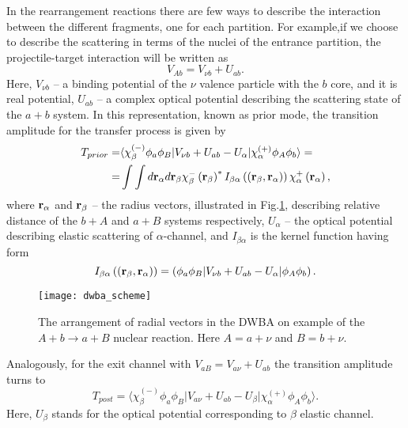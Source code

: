 \documentclass[
12pt, %
oneside, %
english, %
onehalfspacing, %
onehalfspacing, %
headsepline, %
]{MastersDoctoralThesis} %
\begin{document}
In the rearrangement reactions there are few ways to describe the interaction between the different fragments, one for each partition. 
For example,if we choose to describe the scattering in terms of the nuclei of the entrance partition, the projectile-target interaction will be written as
\begin{equation}
V_{Ab}=V_{\nu b} + U_{ab}.
\end{equation}
Here, $V_{\nu b}$ -- a binding potential of the $\nu$ valence particle with the $b$ core, and it is real potential, $U_{ab}$ -- a complex optical potential describing the scattering state of the $a+b$ system.  
In this representation, known as prior mode, the transition amplitude for the transfer process is given by
 \begin{align}
 T_{prior} =& \langle \chi_\beta^{(-)} \phi_a \phi_B  \vert
  V_{\nu b}+U_{ab}-U_{\alpha} \vert
   \chi_\alpha^{(+)} \phi_A \phi_b \rangle = 
   \nonumber \\
= & \int \int d {\bf r}_\alpha  d {\bf r}_\beta
\chi^{-}_\beta \left( {\bf r}_\beta \right)^* 
I_{\beta \alpha}  \left( \left( {\bf r}_\beta ,  {\bf r}_\alpha \right) \right)
\chi^{+}_\alpha \left( {\bf r}_\alpha \right),
\label{dwba_amplitude}
 \end{align}
where ${\bf r}_\alpha$ and ${\bf r}_\beta$ -- the radius vectors, illustrated in Fig.\ref{fig:dwba_scheme}, describing relative distance of the $b+A$ and $a+B$ systems respectively,  $U_\alpha$ -- the optical potential describing elastic scattering of $\alpha$-channel, and $I_{\beta \alpha}$ is the kernel function having form
\begin{equation}
I_{\beta \alpha}  \left( \left( {\bf r}_\beta ,  {\bf r}_\alpha \right) \right) =
\left( \phi_a \phi_B  \vert 
 V_{\nu b}+U_{ab}-U_{\alpha} \vert
 \phi_A \phi_b  \right).
\end{equation}
 
\begin{figure}[tp]
\centering
\texttt{[image: dwba\_scheme]}
\decoRule
\caption{ \footnotesize The arrangement of radial vectors in the DWBA 
on example of the $A+b \rightarrow a + B$ nuclear reaction. Here $A=a+\nu$ 
and $B=b+\nu$. }
\label{fig:dwba_scheme}
\end{figure} 
 
 Analogously, for the exit channel with $V_{aB}= V_{a \nu}+U_{ab}$ the transition amplitude turns to
\begin{equation}
T_{post}=  \langle \chi_\beta^{(-)} \phi_a \phi_B  \vert
  V_{a \nu}+U_{ab}-U_{\beta} \vert
   \chi_\alpha^{(+)} \phi_A \phi_b \rangle.
\end{equation}
Here, $U_\beta$ stands for the optical potential corresponding to $\beta$ elastic channel. 
 
\end{document}
